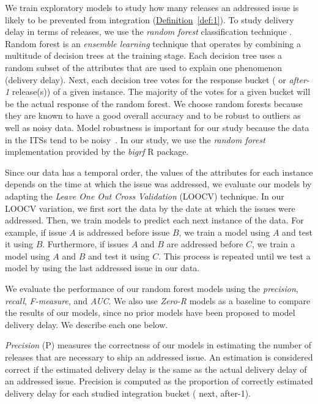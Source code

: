 We train exploratory models to study how many releases an addressed issue is likely
to be prevented from integration (\hyperref[def:1]{Definition}~\ref{def:1}). To
study delivery delay in terms of releases, we use the \textit{random forest}
classification technique \cite{RandomForest2001}. Random forest is an {\em
ensemble learning} technique that operates by combining a multitude of decision
trees at the training stage.  Each decision tree uses a random subset of the
attributes that are used to explain one phenomenon (\eg delivery delay). Next,
each decision tree votes for the response bucket ( or {\em after-1}
release(s)) of a given instance. The majority of the votes for a given bucket
will be the actual response of the random forest. We choose random forests
because they are known to have a good overall accuracy and to be robust to
outliers as well as noisy data. Model robustness is important for our study
because the data in the ITSs tend to be noisy~\cite{Herraiz2008}. In our study,
we use the \textit{random forest} implementation provided by the \textit{bigrf}
R package. 

Since our data has a temporal order, \ie the values of the attributes for each
instance depends on the time at which the issue was addressed, we evaluate our
models by adapting the {\em Leave One Out Cross Validation} (LOOCV) technique.
In our LOOCV variation, we first sort the data by the date at which the issues
were addressed. Then, we train models to predict each next instance of the data. For
example, if issue $A$ is addressed before issue $B$, we train a model using $A$ and
test it using $B$. Furthermore, if issues $A$ and $B$ are addressed before $C$, we
train a model using $A$ and $B$ and test it using $C$. This process is repeated
until we test a model by using the last addressed issue in our data.

We evaluate the performance of our random forest models using the
\textit{precision}, \textit{recall}, \textit{F-measure}, and \textit{AUC}. We
also use \textit{Zero-R} models as a baseline to compare the results of our
models, since no prior models have been proposed to model delivery delay. We
describe each one below.

\textit{Precision} (P) measures the correctness of our models in estimating the
number of releases that are necessary to ship an addressed issue. An estimation is
considered correct if the estimated delivery delay is the same as the actual
delivery delay of an addressed issue. Precision is computed as the proportion of
correctly estimated delivery delay for each studied integration bucket (\eg
next, after-1).

